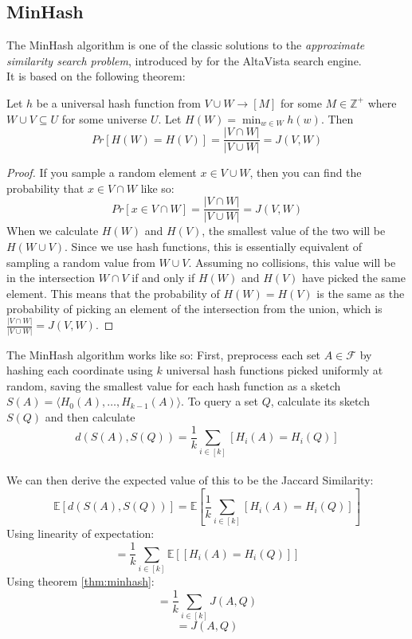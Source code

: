 \subsection{MinHash}
The MinHash algorithm is one of the classic solutions to the \textit{approximate similarity search problem}, introduced by \citet{broder1997minhash} for the AltaVista search engine.\\
It is based on the following theorem:
\begin{theorem}
    \label{thm:minhash}
    Let $h$ be a universal hash function from $V \cup W \rightarrow [M]$ for some $M \in \mathbb{Z}^+$ where $W\cup V\subseteq U$ for some universe $U$. 
    Let $H(W)=\min_{w\in W} h(w)$. Then
    $$Pr[H(W)=H(V)]=\frac{|V\cap W|}{|V \cup W|}= J(V,W)$$
\end{theorem}
\begin{proof}
    If you sample a random element $x \in V \cup W$, then you can find the probability that $x \in V\cap W$ like so:
    $$Pr[x\in V \cap W]=\frac{|V\cap W|}{|V \cup W|}= J(V,W)$$
    When we calculate $H(W)$ and $H(V)$, the smallest value of the two will be $H(W\cup V)$. Since we use hash functions, this is essentially equivalent of sampling a random value from $W\cup V$. Assuming no collisions, this value will be in the intersection $W\cap V$ if and only if $H(W)$ and $H(V)$ have picked the same element. This means that the probability of $H(W)=H(V)$ is the same as the probability of picking an element of the intersection from the union, which is $\frac{|V\cap W|}{|V\cup W|}=J(V,W)$.
\end{proof}
The MinHash algorithm works like so: First, preprocess each set $A\in \mathcal{F}$ by hashing each coordinate using $k$ universal hash functions picked uniformly at random, saving the smallest value for each hash function as a sketch $S(A)=\langle H_0(A), \dots, H_{k-1}(A)\rangle$.
To query a set $Q$, calculate its sketch $S(Q)$ and then calculate $$d(S(A),S(Q))=\frac{1}{k}\sum_{i\in [k]}[H_i(A)=H_i(Q)]$$\\
We can then derive the expected value of this to be the Jaccard Similarity:
$$\mathbb{E}[d(S(A),S(Q))]=\mathbb{E}[\frac{1}{k}\sum_{i\in [k]}[H_i(A)=H_i(Q)]]$$
Using linearity of expectation:
$$=\frac{1}{k}\sum_{i\in [k]}\mathbb{E}[[H_i(A)=H_i(Q)]]$$
Using theorem \ref{thm:minhash}:
$$=\frac{1}{k}\sum_{i\in [k]}J(A,Q)$$
$$=J(A,Q)$$
